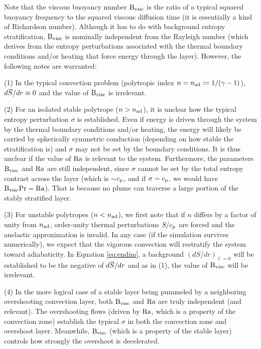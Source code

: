 \documentclass[12pt]{article}
\numberwithin{equation}{section}
\newcommand{\nad}{n_{\rm{ad}}}
\begin{document}
Note that the viscous buoyancy number ${\rm{B_{visc}}}$ is the ratio of a typical squared buoyancy frequency to the squared viscous diffusion time (it is essentially a kind of Richardson number). Although it has to do with background entropy stratification, ${\rm{B_{visc}}}$ is nominally independent from the Rayleigh number (which derives from the entropy perturbations associated with the thermal boundary conditions and/or heating that force energy through the layer). However, the following notes are warranted: 

(1) In the typical convection problem (polytropic index $n=\nad\define1/(\gamma-1)$), $d\overline{S}/dr\equiv0$ and the value of ${\rm{B_{visc}}}$ is irrelevant. 

(2) For an isolated stable polytrope ($n>\nad$), it is unclear how the typical entropy perturbation $\sigma$ is established. Even if energy is driven through the system by the thermal boundary conditions and/or heating, the energy will likely be carried by spherically symmetric conduction (depending on how stable the stratification is) and $\sigma$ may not be set by the boundary conditions. It is thus unclear if the value of ${\rm{Ra}}$ is relevant to the system. Furthermore, the parameters ${\rm{B_{visc}}}$ and ${\rm{Ra}}$ are still independent, since $\sigma$ cannot be set by the total entropy contrast across the layer (which is $\sim$$c_{\rm{p}}$, and if $\sigma=c_{\rm{p}}$, we would have ${\rm{B_{visc}}}{\rm{Pr}} = {\rm{Ra}}$). That is because no plume can traverse a large portion of the stably stratified layer. 

(3) For unstable polytropes ($n<\nad$), we first note that if $n$ differs by a factor of unity from $\nad$, order-unity thermal perturbations $S/c_{\rm{p}}$ are forced and the anelastic approximation is invalid. In any case (if the simulation survives numerically), we expect that the vigorous convection will restratify the system toward adiabaticity. In Equation \eqref{eq:endim}, a background $(dS/dr)_{\ell=0}$ will be established to be the negative of $d\overline{S}/dr$ and as in (1), the value of ${\rm{B_{visc}}}$ will be irrelevant. 

(4) In the more logical case of a stable layer being pummeled by a neighboring overshooting convection layer, both ${\rm{B_{visc}}}$ and ${\rm{Ra}}$ are truly independent (and relevant). The overshooting flows (driven by ${\rm{Ra}}$, which is a property of the convection zone) establish the typical $\sigma$ in both the convection zone and overshoot layer. Meanwhile, ${\rm{B_{visc}}}$ (which is a property of the stable layer) controls how strongly the overshoot is decelerated. 


	
	
	
\end{document}
